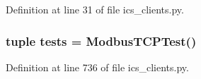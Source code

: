 Definition at line 31 of file ics\+\_\+clients.\+py.

\subsubsection[{tests}]{\setlength{\rightskip}{0pt plus 5cm}tuple tests = {\bf Modbus\+T\+C\+P\+Test}()}\label{namespaceprotolibs_1_1ics__clients_a6e64b5a4beec8eec41b9c30adfbafad3}


Definition at line 736 of file ics\+\_\+clients.\+py.

